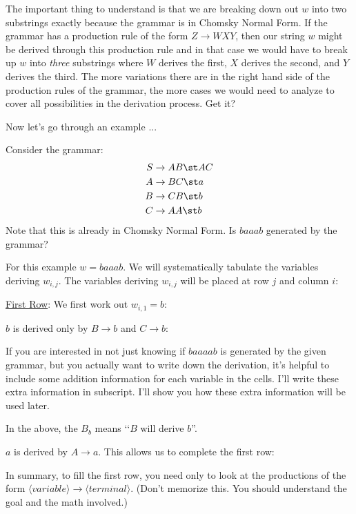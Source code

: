 The important thing to understand is that we are breaking down
out $w$ into two substrings exactly because the grammar is in
Chomsky Normal Form.
If the grammar has a production rule of the form
$Z \rightarrow WXY$, then our string $w$
might be derived through this production rule and in that case
we would have to break up $w$ into \textit{three} substrings
where $W$ derives the first, $X$ derives the second, and $Y$
derives the third.
The more variations there are in the right hand side of the
production rules of the grammar, the more cases
we would need to analyze to cover
all possibilities in the derivation process.
Get it?

Now let's go through an example ...


\newpage
\begin{eg}
Consider the grammar:
\begin{align*}
S &\rightarrow AB \st AC \\
A &\rightarrow BC \st a \\
B &\rightarrow CB \st b \\
C &\rightarrow AA \st b
\end{align*}
Note that this is already in Chomsky Normal Form.
Is $baaab$ generated by the grammar?
\end{eg}

\SOLUTION
For this example $w = baaab$.
We will systematically tabulate the variables deriving $w_{i,j}$.
The variables deriving $w_{i,j}$ will be placed at row $j$ and column $i$:


\underline{First Row}:
We first work out $w_{i,1} = b$:


$b$ is derived only by $B \rightarrow b$ and $C \rightarrow b$:

If you are interested in not just knowing if $baaaab$ is generated by the given grammar,
but you actually want to write down the derivation, it's helpful to include
some addition information for each variable in the cells.
I'll write these extra information in subscript.
I'll show you how these extra information will be used later.

In the above, the $B_b$ means \lq\lq $B$ will derive $b$''.

$a$ is derived by $A \rightarrow a$. This allows us to complete
the first row:


In summary, to fill the first row, you need only to look at the
productions of the form $\langle variable \rangle \rightarrow \langle terminal
\rangle$.
(Don't memorize this. You should understand the goal and the math involved.)

